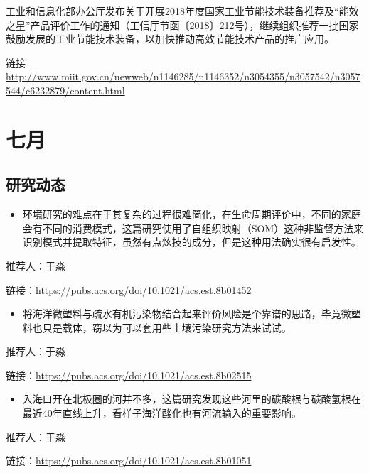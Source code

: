 \documentclass[
]{book}
\providecommand{\tightlist}{%
  \setlength{\itemsep}{0pt}\setlength{\parskip}{0pt}}
\begin{document}
工业和信息化部办公厅发布关于开展2018年度国家工业节能技术装备推荐及``能效之星''产品评价工作的通知（工信厅节函〔2018〕212号），继续组织推荐一批国家鼓励发展的工业节能技术装备，以加快推动高效节能技术产品的推广应用。

链接 \url{http://www.miit.gov.cn/newweb/n1146285/n1146352/n3054355/n3057542/n3057544/c6232879/content.html}

\hypertarget{ux4e03ux6708}{%
\section*{七月}\label{ux4e03ux6708}}

\hypertarget{ux7814ux7a76ux52a8ux6001-8}{%
\subsection*{研究动态}\label{ux7814ux7a76ux52a8ux6001-8}}

\begin{itemize}
\tightlist
\item
  环境研究的难点在于其复杂的过程很难简化，在生命周期评价中，不同的家庭会有不同的消费模式，这篇研究使用了自组织映射（SOM）这种非监督方法来识别模式并提取特征，虽然有点炫技的成分，但是这种用法确实很有启发性。
\end{itemize}

推荐人：于淼

链接：\url{https://pubs.acs.org/doi/10.1021/acs.est.8b01452}

\begin{itemize}
\tightlist
\item
  将海洋微塑料与疏水有机污染物结合起来评价风险是个靠谱的思路，毕竟微塑料也只是载体，窃以为可以套用些土壤污染研究方法来试试。
\end{itemize}

推荐人：于淼

链接：\url{https://pubs.acs.org/doi/10.1021/acs.est.8b02515}

\begin{itemize}
\tightlist
\item
  入海口开在北极圈的河并不多，这篇研究发现这些河里的碳酸根与碳酸氢根在最近40年直线上升，看样子海洋酸化也有河流输入的重要影响。
\end{itemize}

推荐人：于淼

链接：\url{https://pubs.acs.org/doi/10.1021/acs.est.8b01051}
\end{document}
